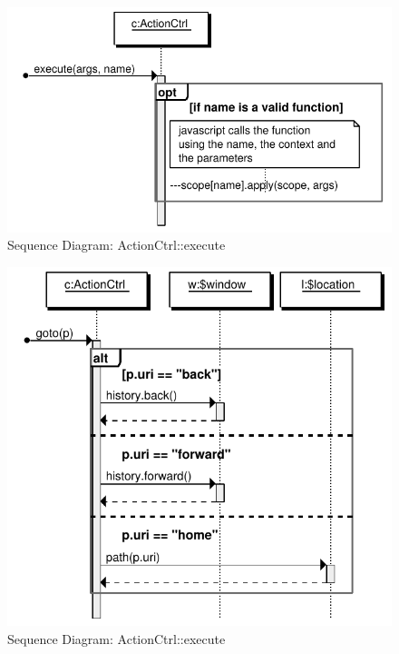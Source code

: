 \begin{figure}[htb]
    \centering
    \includegraphics{figures/design/seqdia/actionCtrl-execute.pdf}
    \caption{Sequence Diagram: ActionCtrl::execute}
    \label{fig:design-seqdia-actionCtrl-execute}
\end{figure}

\begin{figure}[htb]
    \centering
    \includegraphics{figures/design/seqdia/actionCtrl-goto.pdf}
    \caption{Sequence Diagram: ActionCtrl::execute}
    \label{fig:design-seqdia-actionCtrl-goto}
\end{figure}

\FloatBarrier

